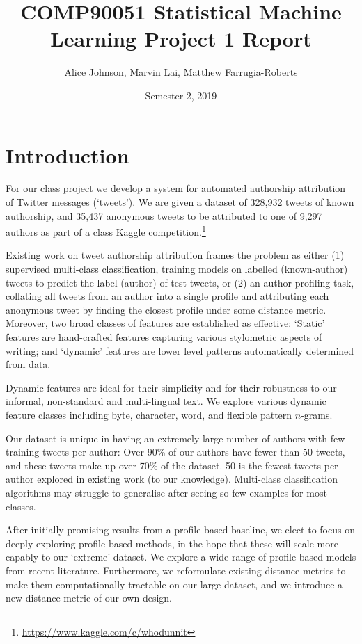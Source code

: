 \documentclass[twocolumn,10pt]{article}
\title{COMP90051 Statistical Machine Learning Project 1 Report}
\author{
Alice Johnson,
Marvin Lai,
Matthew Farrugia-Roberts}
\date{Semester 2, 2019}
\begin{document}
\maketitle

\section{Introduction}
For our class project we develop a system for automated 
authorship attribution of Twitter messages (`tweets'). We
are given a dataset of 328,932 tweets of known authorship,
and 35,437 anonymous tweets to be attributed to one of
9,297 authors as part of a class Kaggle competition.\footnote{
\url{https://www.kaggle.com/c/whodunnit}}

Existing work on tweet authorship attribution\supercite{rocha2016authorship, bhargava2013stylometric, schwartz2013authorship}
frames the problem as either
(1) supervised multi-class classification, training models on
labelled (known-author) tweets to predict the label (author)
of test tweets, or
(2) an author profiling task, collating all tweets from an
author into a single profile and attributing each anonymous
tweet by finding the closest profile under some distance metric.
Moreover, two broad classes of features are established as
effective:
`Static' features are hand-crafted features capturing various
stylometric aspects of writing; and
`dynamic' features are lower level patterns automatically
determined from data.

Dynamic features are ideal for their simplicity and for their
robustness to our informal, non-standard and multi-lingual
text. We explore various dynamic feature classes including
byte, character, word, and flexible pattern $n$-grams.

Our dataset is unique in having an extremely large number
of authors with few training tweets per author:
Over 90\% of our authors have fewer than 50 tweets,
and these tweets make up over 70\% of the dataset.
50 is the fewest tweets-per-author explored in
existing work (to our knowledge).
Multi-class classification algorithms may struggle to
generalise after seeing so few examples for most classes.

After initially promising results from a profile-based
baseline, we elect to focus on deeply exploring profile-based
methods, in the hope that these will
scale more capably to our `extreme' dataset.
We explore a wide range of profile-based models from recent
literature.
Furthermore, we reformulate existing distance metrics
to make them computationally tractable on our large dataset,
and we introduce a new distance metric of our own design.
\end{document}
